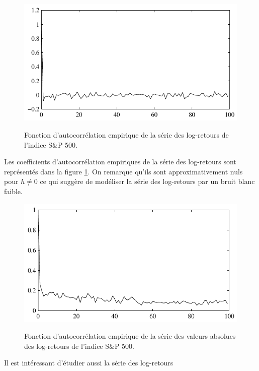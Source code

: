 \begin{figure}
  \centering
  \includegraphics[width=\textwidth]{Figures/corrsplogretour}\\
  \caption{Fonction d'autocorr\'elation empirique de la s\'erie des log-retours
 de l'indice S\&P 500.}\label{fig:sp-xcorr}
\end{figure}
  Les coefficients d'autocorr\'elation
empiriques de la s\'erie des log-retours sont repr\'esent\'es dans la figure
\ref{fig:sp-xcorr}. On remarque qu'ils sont approximativement nuls
pour $h \ne 0$ ce qui sugg\`ere de mod\'eliser la s\'erie des
log-retours par un bruit blanc faible.
\begin{figure}
  \centering
  \includegraphics[width=\textwidth]{Figures/corrabssplogretour}\\
  \caption{Fonction d'autocorr\'elation empirique de la s\'erie des valeurs absolues des
 log-retours de l'indice S\&P 500.}\label{fig:sp-abs-xcorr}
\end{figure}
Il est int\'eressant d'\'etudier aussi la s\'erie des log-retours
